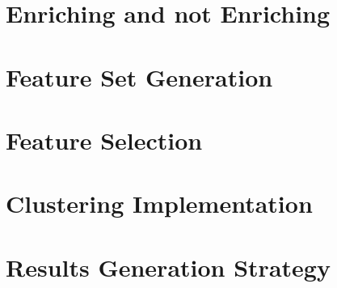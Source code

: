 \section{Enriching and not Enriching}

\section{Feature Set Generation}

\section{Feature Selection}

\section{Clustering Implementation}

\section{Results Generation Strategy}
